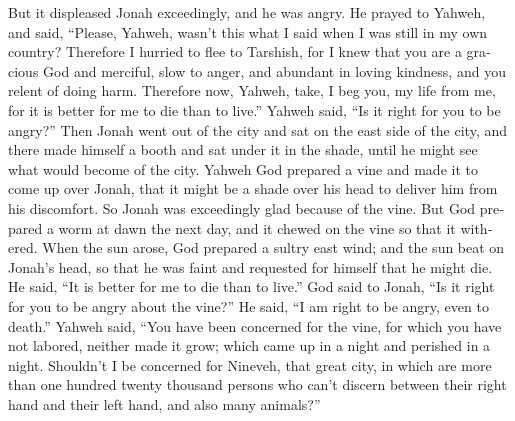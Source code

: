\begin{paracol}{2}
\begin{otherlanguage}{english}
 But it displeased Jonah exceedingly, and he was angry.
 He prayed to Yahweh, and said, ``Please, Yahweh, wasn't
this what I said when I was still in my own country? Therefore I hurried
to flee to Tarshish, for I knew that you are a gracious God and
merciful, slow to anger, and abundant in loving kindness, and you relent
of doing harm.  Therefore now, Yahweh, take, I beg you, my
life from me, for it is better for me to die than to live.''
 Yahweh said, ``Is it right for you to be angry?''
 Then Jonah went out of the city and sat on the east side
of the city, and there made himself a booth and sat under it in the
shade, until he might see what would become of the city. 
Yahweh God prepared a vine and made it to come up over Jonah, that it
might be a shade over his head to deliver him from his discomfort. So
Jonah was exceedingly glad because of the vine.  But God
prepared a worm at dawn the next day, and it chewed on the vine so that
it withered.  When the sun arose, God prepared a sultry
east wind; and the sun beat on Jonah's head, so that he was faint and
requested for himself that he might die. He said, ``It is better for me
to die than to live.''  God said to Jonah, ``Is it right
for you to be angry about the vine?'' He said, ``I am right to be angry,
even to death.''  Yahweh said, ``You have been concerned
for the vine, for which you have not labored, neither made it grow;
which came up in a night and perished in a night. 
Shouldn't I be concerned for Nineveh, that great city, in which are more
than one hundred twenty thousand persons who can't discern between their
right hand and their left hand, and also many animals?''
\end{otherlanguage} \end{paracol}
